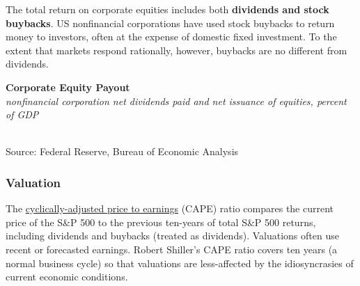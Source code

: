 \documentclass{report}
\makeatletter
\newcommand{\tbllink}[1]{\href{https://raw.githubusercontent.com/bdecon/US-chartbook/master/chartbook/data/#1}{\faTable}}
\newcommand*\short[1]{\expandafter\@gobbletwo\number\numexpr#1\relax}
\newcommand{\sbar}[4]{
		\addplot[ybar stacked, bar width=2.3pt, draw opacity=0, fill=#1] 
			table [x=#2, y=#3, col sep=comma]{#4};}
\newcommand{\dateaxisticks}{
		date coordinates in=x, axis line style={draw=none},
		xmax={2023-10-01},
		max space between ticks=40,	    
		xtick={{1990-01-01}, {1992-01-01}, {1994-01-01}, 
			{1996-01-01}, {1998-01-01}, {2000-01-01}, 
			{2002-01-01}, {2004-01-01}, {2006-01-01},
			{2008-01-01}, {2010-01-01}, {2012-01-01}, {2014-01-01},
		    {2016-01-01}, {2018-01-01}, {2020-01-01}, {2022-01-01}, 
		    {2024-01-01}, {2026-01-01}},
		minor xtick={{1989-01-01}, {1991-01-01}, {1993-01-01},
			{1995-01-01}, {1997-01-01}, {1999-01-01}, 
			{2001-01-01}, {2003-01-01}, {2005-01-01}, {2007-01-01},
		    {2009-01-01}, {2011-01-01}, {2013-01-01}, {2015-01-01},
		    {2017-01-01}, {2019-01-01}, {2021-01-01}, {2023-01-01}, 
		    {2025-01-01}, {2027-01-01}},
		enlarge y limits={0.06}, enlarge x limits={0.01},
		}
\newcommand{\bbar}[2]{extra #1 ticks = {{#2}}, extra #1 tick labels = ,
		extra #1 tick style = {grid=major, grid style={thick, black!25}},}
\newcommand{\rbars}{
		\fill[color=black!10] (axis cs:{1990-07-01},\pgfkeysvalueof{/pgfplots/ymin}) rectangle 
			(axis cs:{1991-03-01}, \pgfkeysvalueof{/pgfplots/ymax});
		\fill[color=black!10] (axis cs:{2007-12-01},\pgfkeysvalueof{/pgfplots/ymin}) rectangle 
			(axis cs:{2009-07-01}, \pgfkeysvalueof{/pgfplots/ymax});
		\fill[color=black!10] (axis cs:{2001-03-01},\pgfkeysvalueof{/pgfplots/ymin}) rectangle 
			(axis cs:{2001-11-01}, \pgfkeysvalueof{/pgfplots/ymax});
		\fill[color=black!10] (axis cs:{2020-02-01},\pgfkeysvalueof{/pgfplots/ymin}) rectangle 
			(axis cs:{2020-05-01}, \pgfkeysvalueof{/pgfplots/ymax});}
\makeatother
\begin{document}
{\begin{minipage}{0.76\textwidth}
\small The total return on corporate equities includes both \textbf{dividends and stock buybacks}. US nonfinancial corporations have used stock buybacks to return money to investors, often at the expense of domestic fixed investment. To the extent that markets respond rationally, however, buybacks are no different from dividends. 


\vspace{1mm}

\normalsize \textbf{Corporate Equity Payout}\\
\footnotesize{\textit{nonfinancial corporation net dividends paid and net issuance of equities, percent of GDP}}\\
\hspace*{-2mm} \\
\footnotesize{Source: Federal Reserve, Bureau of Economic Analysis} \hfill \tbllink{eq_payout.csv}
\end{minipage}
\newpage
\begin{minipage}{0.76\textwidth}
 
\subsubsection*{Valuation}
\small The \href{http://www.econ.yale.edu/~shiller/data.htm}{cyclically-adjusted price to earnings} (CAPE) ratio compares the current price of the S\&P 500 to the previous ten-years of total S\&P 500 returns, including dividends and buybacks (treated as dividends). Valuations often use recent or forecasted earnings. Robert Shiller's CAPE ratio covers ten years (a normal business cycle) so that valuations are less-affected by the idiosyncrasies of current economic conditions. 


\vspace{1mm}


\end{minipage}}
\end{document}
